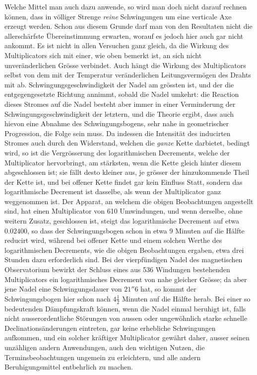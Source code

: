\expandafter\def\csname HistoricalNoteText393\endcsname{Welche Mittel man auch dazu anwende, so wird man doch nicht darauf rechnen können, dass in völliger Strenge \textit{reine} Schwingungen um eine verticale Axe erzeugt werden. Schon aus diesem Grunde darf man von den Resultaten nicht die allerschärfste Übereinstimmung erwarten, worauf es jedoch hier auch gar nicht ankommt.}
\expandafter\def\csname HistoricalNoteText392\endcsname{Es ist nicht in allen Versuchen ganz gleich, da die Wirkung des Multiplicators sich mit einer, wie oben bemerkt ist, an sich nicht unveränderlichen Grösse verbindet. Auch hängt die Wirkung des Multiplicators selbst von dem mit der Temperatur veränderlichen Leitungsvermögen des Drahts mit ab.}
\noindent Schwingungsgeschwindigkeit der Nadel am grössten ist, und der die entgegengesetzte Richtung annimmt, sobald die Nadel umkehrt: die Reaction dieses Stromes auf die Nadel besteht aber immer in einer Verminderung der Schwingungsgeschwindigkeit der letztern, und die Theorie ergibt, dass auch hievon eine Abnahme des Schwingungsbogens, sehr nahe in geometrischer Progression, die Folge sein muss. Da indessen die Intensität des inducirten Stromes auch durch den Widerstand, welchen die \textit{ganze} Kette darbietet, bedingt wird, so ist die Vergrösserung des logarithmischen Decrements, welche der Multiplicator hervorbringt, am stärksten, wenn die Kette gleich hinter diesem abgeschlossen ist; sie fällt desto kleiner aus, je grösser der hinzukommende Theil der Kette ist, und bei offener Kette findet gar kein Einfluss Statt, sondern das logarithmische Decrement ist dasselbe, als wenn der Multiplicator ganz weggenommen ist. Der Apparat, an welchem die obigen Beobachtungen angestellt sind, hat einen Multiplicator von 610 Umwindungen, und wenn derselbe, ohne weitern Zusatz, geschlossen ist, steigt das logarithmische Decrement auf etwa $0.02400$, so dass der Schwingungsbogen schon in etwa 9 Minuten auf die Hälfte reducirt wird, während bei offener Kette und einem solchen Werthe des logarithmischen Decrements, wie die obigen Beobachtungen ergaben, etwa drei Stunden dazu erforderlich sind. Bei der vierpfündigen Nadel des magnetischen Observatorium bewirkt der Schluss eines aus 536 Windungen bestehenden Multiplicators ein logarithmisches Decrement von nahe gleicher Grösse; da aber jene Nadel eine Schwingungsdauer von $21''6$ hat, so kommt der Schwingungsbogen hier schon nach $4\tfrac12$ Minuten auf die Hälfte herab. Bei einer so bedeutenden Dämpfungskraft können, wenn die Nadel einmal beruhigt ist, falls nicht ausserordentliche Störungen von aussen oder ungewöhnlich starke schnelle Declinationsänderungen eintreten, gar keine erhebliche Schwingungen aufkommen, und ein solcher kräftiger Multiplicator gewährt daher, ausser seinen unzähligen andern Anwendungen, auch den wichtigen Nutzen, die Terminsbeobachtungen ungemein zu erleichtern, und alle andern Beruhigungsmittel entbehrlich zu machen.


